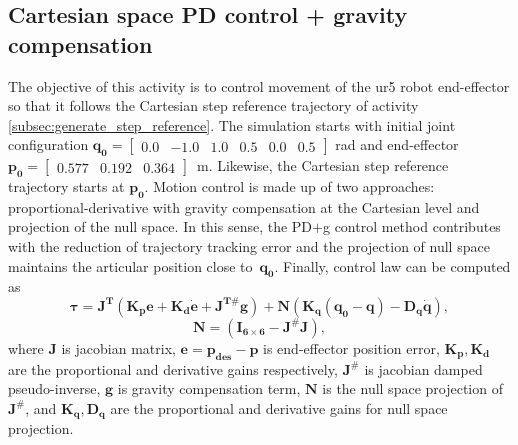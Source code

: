 \graphicspath{{images/act_1.6/}}
\subsection{Cartesian space PD control + gravity compensation}
The objective of this activity is to control movement of the ur5 robot end-effector so that it follows the Cartesian step reference trajectory of activity \ref{subsec:generate_step_reference}. The simulation starts with initial joint configuration $\mathbf{q_0}=\begin{bmatrix} 0.0 & -1.0 & 1.0 & 0.5 & 0.0 & 0.5 \end{bmatrix}$ rad and end-effector $\mathbf{p_0}=\begin{bmatrix}  0.577 &   0.192 &   0.364 \end{bmatrix}$~m. Likewise, the Cartesian step reference trajectory starts at $\mathbf{p_0}$. Motion control is made up of two approaches: proportional-derivative with gravity compensation at the Cartesian level and projection of the null space. In this sense, the PD$+$g control method contributes with the reduction of trajectory tracking error and the projection of null space maintains the articular position close to~$\mathbf{q_0}$. Finally, control law can be computed as 
\begin{equation}
	\boldsymbol{\tau}
	= \mathbf{J^T} (\mathbf{K_p e} + \mathbf{K_d \dot{e}}+ \mathbf{J^{T\#} g}) + \mathbf{N} \left(\mathbf{K_q(q_0-q) - D_q \dot{q}} \right),
	\label{eq:cartesian_PD_control_g_null_space}
\end{equation}
\begin{equation*}
	\mathbf{N}=(\mathbf{I_{6 \times 6}} - \mathbf{J^{\#} J} ),
\end{equation*}
\noindent where $\mathbf{J}$ is jacobian matrix, $\mathbf{e}=\mathbf{p_{des} - p}$ is end-effector position error, $\mathbf{K_p, K_d}$ are the proportional and derivative gains respectively, $\mathbf{J^{\#}}$ is jacobian damped pseudo-inverse, $\mathbf{g}$ is gravity compensation term, $\mathbf{N}$ is the null space projection of $\mathbf{J^{\#}}$, and $\mathbf{K_q, D_q}$ are the proportional and derivative gains for null space projection. \vspace{.5cm}

